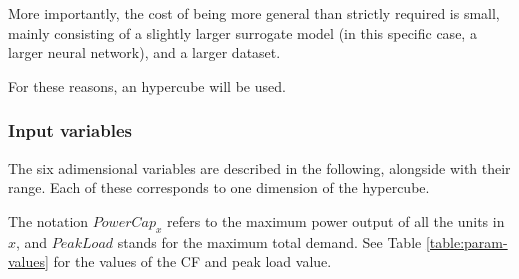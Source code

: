 More importantly, the cost of being more general than strictly required is small, mainly consisting of a slightly larger surrogate model (in this specific case, a larger neural network), and a larger dataset.

For these reasons, an hypercube will be used.

\subsubsection{Input variables}

The six adimensional variables are described in the following, alongside with their range. Each of these corresponds to one dimension of the hypercube.

The notation $PowerCap_{x}$ refers to the maximum power output of all the units in $x$, and $PeakLoad$ stands for the maximum total demand. See Table \ref{table:param-values} for the values of the CF and peak load value.

